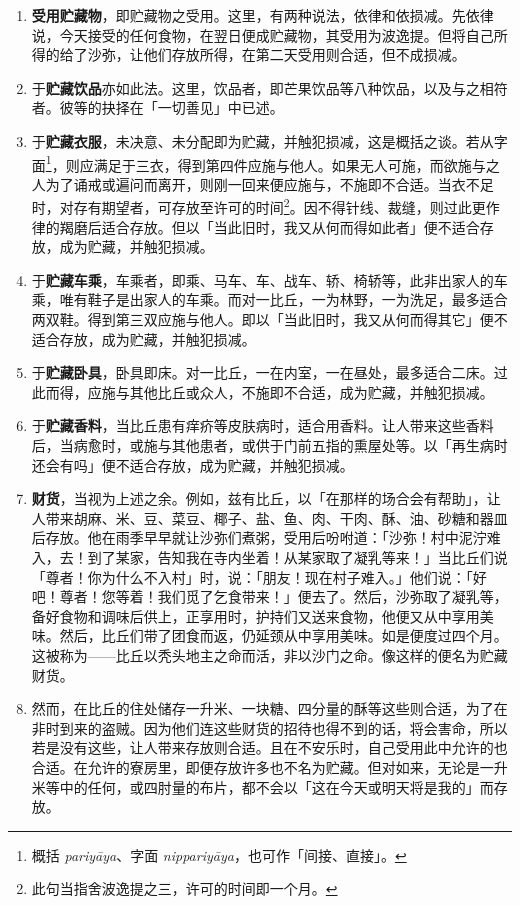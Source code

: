 \begin{enumerate}\item \textbf{受用贮藏物}，即贮藏物之受用。这里，有两种说法，依律和依损减。先依律说，今天接受的任何食物，在翌日便成贮藏物，其受用为波逸提。但将自己所得的给了沙弥，让他们存放所得，在第二天受用则合适，但不成损减。
\item 于\textbf{贮藏饮品}亦如此法。这里，饮品者，即芒果饮品等八种饮品，以及与之相符者。彼等的抉择在「一切善见」中已述。
\item 于\textbf{贮藏衣服}，未决意、未分配即为贮藏，并触犯损减，这是概括之谈。若从字面\footnote{概括 \textit{pariyāya}、字面 \textit{nippariyāya}，也可作「间接、直接」。}，则应满足于三衣，得到第四件应施与他人。如果无人可施，而欲施与之人为了诵戒或遍问而离开，则刚一回来便应施与，不施即不合适。当衣不足时，对存有期望者，可存放至许可的时间\footnote{此句当指舍波逸提之三，许可的时间即一个月。}。因不得针线、裁缝，则过此更作律的羯磨后适合存放。但以「当此旧时，我又从何而得如此者」便不适合存放，成为贮藏，并触犯损减。
\item 于\textbf{贮藏车乘}，车乘者，即乘、马车、车、战车、轿、椅轿等，此非出家人的车乘，唯有鞋子是出家人的车乘。而对一比丘，一为林野，一为洗足，最多适合两双鞋。得到第三双应施与他人。即以「当此旧时，我又从何而得其它」便不适合存放，成为贮藏，并触犯损减。
\item 于\textbf{贮藏卧具}，卧具即床。对一比丘，一在内室，一在昼处，最多适合二床。过此而得，应施与其他比丘或众人，不施即不合适，成为贮藏，并触犯损减。
\item 于\textbf{贮藏香料}，当比丘患有痒疥等皮肤病时，适合用香料。让人带来这些香料后，当病愈时，或施与其他患者，或供于门前五指的熏屋处等。以「再生病时还会有吗」便不适合存放，成为贮藏，并触犯损减。
\item \textbf{财货}，当视为上述之余。例如，兹有比丘，以「在那样的场合会有帮助」，让人带来胡麻、米、豆、菜豆、椰子、盐、鱼、肉、干肉、酥、油、砂糖和器皿后存放。他在雨季早早就让沙弥们煮粥，受用后吩咐道：「沙弥！村中泥泞难入，去！到了某家，告知我在寺内坐着！从某家取了凝乳等来！」当比丘们说「尊者！你为什么不入村」时，说：「朋友！现在村子难入。」他们说：「好吧！尊者！您等着！我们觅了乞食带来！」便去了。然后，沙弥取了凝乳等，备好食物和调味后供上，正享用时，护持们又送来食物，他便又从中享用美味。然后，比丘们带了团食而返，仍延颈从中享用美味。如是便度过四个月。这被称为——比丘以秃头地主之命而活，非以沙门之命。像这样的便名为贮藏财货。
\item 然而，在比丘的住处储存一升米、一块糖、四分量的酥等这些则合适，为了在非时到来的盗贼。因为他们连这些财货的招待也得不到的话，将会害命，所以若是没有这些，让人带来存放则合适。且在不安乐时，自己受用此中允许的也合适。在允许的寮房里，即便存放许多也不名为贮藏。但对如来，无论是一升米等中的任何，或四肘量的布片，都不会以「这在今天或明天将是我的」而存放。\end{enumerate}

